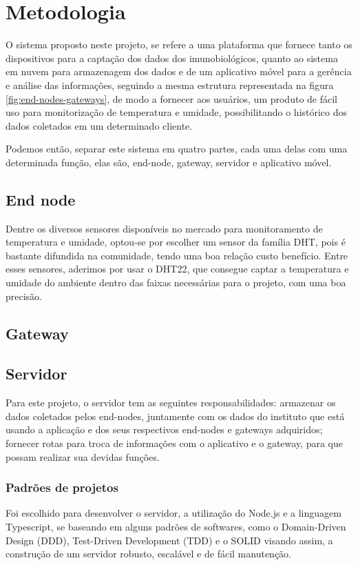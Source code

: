 \chapter{Metodologia}
\label{cap:metodologia}
O sistema proposto neste projeto, se refere a uma plataforma que fornece tanto os dispositivos para a captação dos dados dos imunobiológicos, quanto ao sistema em nuvem para armazenagem dos dados e de um aplicativo móvel para a gerência e análise das informações, seguindo a mesma estrutura representada na figura \ref{fig:end-nodes-gateways}, de modo a fornecer aos usuários, um produto  de fácil uso para monitorização de temperatura e umidade, possibilitando o histórico dos dados coletados em um determinado cliente.

Podemos então, separar este sistema em quatro partes, cada uma delas com uma determinada função, elas são, end-node, gateway, servidor e aplicativo móvel.

\section{End node}
\label{metod:node}
Dentre os diversos sensores disponíveis no mercado para monitoramento de temperatura e umidade, optou-se por escolher um sensor da família DHT, pois é bastante difundida na comunidade, tendo uma boa relação custo benefício. Entre esses sensores, aderimos por usar o DHT22, que consegue captar a temperatura e umidade do ambiente dentro das faixas necessárias para o projeto, com uma boa precisão.

\section{Gateway}
\label{metod:gateway}

\section{Servidor}
\label{metod:servidor}
Para este projeto, o servidor tem as seguintes responsabilidades: armazenar os dados coletados pelos end-nodes, juntamente com os dados do instituto que está usando a aplicação e dos seus respectivos end-nodes e gateways adquiridos; fornecer rotas para troca de informações com o aplicativo e o gateway, para que possam realizar sua devidas funções.

\subsection{Padrões de projetos}
\label{metod:servidor:padroes}
Foi escolhido para desenvolver o servidor, a utilização do Node.js e a linguagem Typescript, se baseando em alguns padrões de softwares, como o Domain-Driven Design (DDD), Test-Driven Development (TDD) e o SOLID visando assim, a construção de um servidor robusto, escalável e de fácil manutenção.

